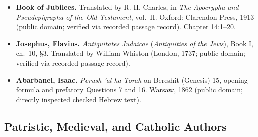 \begin{itemize}
\item \textbf{Book of Jubilees.} Translated by R. H. Charles, in \emph{The Apocrypha and Pseudepigrapha of the Old Testament}, vol.~II. Oxford: Clarendon Press, 1913 (public domain; verified via recorded passage record). Chapter 14:1--20.
\item \textbf{Josephus, Flavius.} \emph{Antiquitates Judaicae} (\emph{Antiquities of the Jews}), Book I, ch.~10, \S 3. Translated by William Whiston (London, 1737; public domain; verified via recorded passage record).
\item \textbf{Abarbanel, Isaac.} \emph{Perush 'al ha-Torah} on Bereshit (Genesis) 15, opening formula and prefatory Questions 7 and 16. Warsaw, 1862 (public domain; directly inspected checked Hebrew text).
\end{itemize}

\subsection*{Patristic, Medieval, and Catholic Authors}


